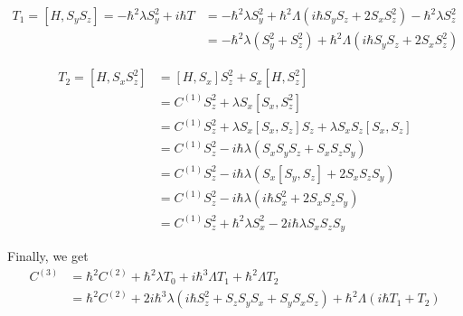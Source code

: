 \documentclass[11pt,a4paper]{article}
\begin{document}
\begin{align*}
T_1 =[H, S_y S_z]  = - \hbar^2 \lambda S_y^2  + i \hbar T &= - \hbar^2 \lambda S_y^2  +  \hbar^2 \Lambda  ( i \hbar S_y S_z+ 2 S_x S_z^2) - \hbar^2 \lambda   S_z^2\\
&= - \hbar^2 \lambda (S_y^2 + S_z^2) +  \hbar^2 \Lambda  ( i \hbar S_y S_z+ 2 S_x S_z^2) 
\end{align*}

\begin{align*}
T_2 =[H, S_x S_z^2] & = [H, S_x ]S_z^2 + S_x [H,  S_z^2] \\
 &= C^{(1)}S_z^2 + \lambda S_x [S_x,  S_z^2]  \\
&= C^{(1)}S_z^2 + \lambda S_x [S_x,  S_z]S_z + \lambda S_x S_z [S_x,  S_z]  \\
&= C^{(1)}S_z^2 - i \hbar  \lambda (S_x S_y S_z +  S_x S_z S_y)  \\
&= C^{(1)}S_z^2 - i \hbar  \lambda (S_x [S_y, S_z] + 2 S_x S_z S_y)  \\
&= C^{(1)}S_z^2 - i \hbar  \lambda (i \hbar S_x^2 + 2 S_x S_z S_y)  \\
&= C^{(1)}S_z^2 + \hbar^2  \lambda  S_x^2  - 2 i \hbar  \lambda  S_x S_z S_y
\end{align*}

Finally, we get 
\begin{align*}
C^{(3)}&=\hbar^2  C^{(2)} +  \hbar^2 \lambda  T_0   +  i  \hbar^3 \Lambda T_1 + \hbar^2 \Lambda T_2 \\
&=\hbar^2  C^{(2)} +  2i \hbar^3 \lambda  (i \hbar S_z^2  + S_z S_y S_x   + S_y S_xS_z )    +  \hbar^2 \Lambda( i  \hbar T_1 +  T_2) 
\end{align*}
\end{document}
